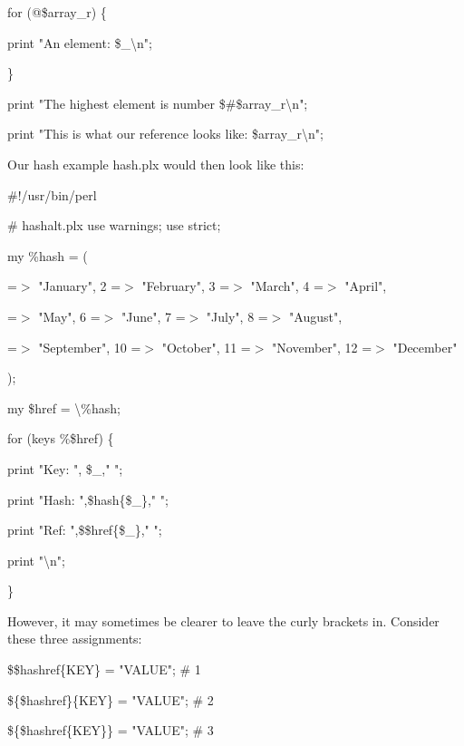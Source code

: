 \documentclass[a4paper,11pt]{book}
\begin{document}
\noindent for (@\$array\_r) \{

\noindent print "An element: \$\_\textbackslash n";

\noindent \}

\noindent print "The highest element is number \$\#\$array\_r\textbackslash n";

\noindent print "This is what our reference looks like: \$array\_r\textbackslash n";

\noindent 

\noindent Our hash example hash.plx would then look like this:

\noindent 

\noindent \#!/usr/bin/perl

\noindent \# hashalt.plx use warnings; use strict;

\noindent 

\noindent 

\noindent my \%hash = (

 =$>$ "January", 2 =$>$ "February", 3 =$>$ "March", 4 =$>$ "April",

 =$>$ "May", 6 =$>$ "June", 7 =$>$ "July", 8 =$>$ "August",

 =$>$ "September", 10 =$>$ "October", 11 =$>$ "November", 12 =$>$ "December"

\noindent );

\noindent 

\noindent my \$href = \textbackslash \%hash;

\noindent for (keys \%\$href) \{

\noindent print "Key: ", \$\_," ";

\noindent print "Hash: ",\$hash\{\$\_\}," ";

\noindent print "Ref: ",\$\$href\{\$\_\}," ";

\noindent print "\textbackslash n";

\noindent \}

\noindent 

\noindent However, it may sometimes be clearer to leave the curly brackets in. Consider these three assignments:

\noindent 

\noindent 

\noindent \$\$hashref\{KEY\} = "VALUE"; \# 1

\noindent \$\{\$hashref\}\{KEY\} = "VALUE"; \# 2

\noindent \$\{\$hashref\{KEY\}\} = "VALUE"; \# 3

\noindent 
\end{document}
